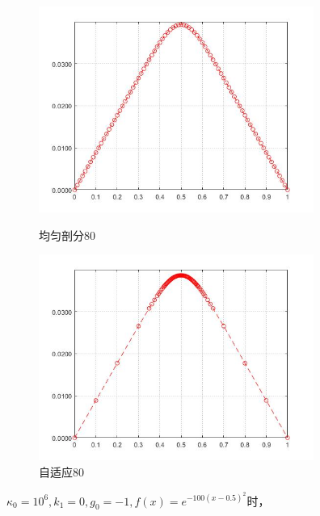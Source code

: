 \documentclass[12pt,fontset=mac]{ctexart}
\begin{document}
\begin{figure}[H]
	\centering
	\begin{minipage}[t]{0.48\textwidth}
		\centering
		\includegraphics[width=9cm]{方程二，均匀剖分80.jpg}
		\caption{均匀剖分80}
	\end{minipage}
	\begin{minipage}[t]{0.48\textwidth}
		\centering
		\includegraphics[width=9cm]{方程二，自适应80.jpg}
		\caption{自适应80}
	\end{minipage}
\end{figure}
$\kappa_0=10^6,k_1=0,g_0=-1,f(x)=e^{-100(x-0.5)^2}$时，\\
\end{document}
